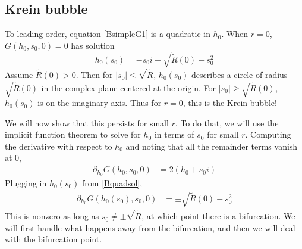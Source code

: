 \documentclass[thesis.tex]{subfiles}
\begin{document}
\subsection{Krein bubble}

To leading order, equation \cref{BsimpleG1} is a quadratic in $h_0$. When $r = 0$, $G(h_0, s_0, 0) = 0$ has solution
\begin{equation}\label{Bquadsol}
h_0(s_0) = -s_0 i \pm \sqrt{ \tilde{R}(0) - s_0^2 }
\end{equation}
Assume $\tilde{R}(0) > 0$. Then for $|s_0| \leq \sqrt{\tilde{R}}$, $h_0(s_0)$ describes a circle of radius $\sqrt{\tilde{R}(0)}$ in the complex plane centered at the origin. For $|s_0| \geq \sqrt{\tilde{R}(0)}$, $h_0(s_0)$ is on the imaginary axis. Thus for $r = 0$, this is the Krein bubble!

We will now show that this persists for small $r$. To do that, we will use the implicit function theorem to solve for $h_0$ in terms of $s_0$ for small $r$. Computing the derivative with respect to $h_0$ and noting that all the remainder terms vanish at 0,
\begin{align*}
\partial_{h_0} G(h_0, s_0, 0) 
&= 2 ( h_0 + s_0 i)
\end{align*}
Plugging in $h_0(s_0)$ from \cref{Bquadsol},
\begin{align*}
\partial_{h_0} G(h_0(s_0), s_0, 0) 
&= \pm \sqrt{ \tilde{R}(0) - s_0^2 }
\end{align*}
This is nonzero as long as $s_0 \neq \pm \sqrt{\tilde{R}}$, at which point there is a bifurcation. We will first handle what happens away from the bifurcation, and then we will deal with the bifurcation point.
\end{document}
